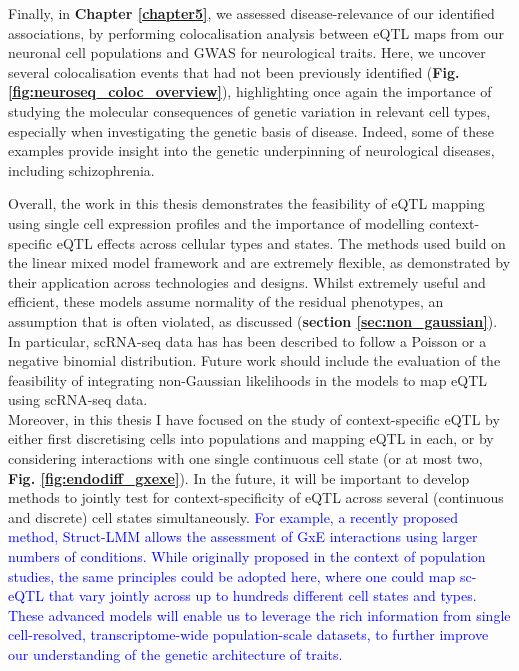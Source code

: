 Finally, in \textbf{Chapter \ref{chapter5}}, we assessed disease-relevance of our identified associations, by performing colocalisation analysis between eQTL maps from our neuronal cell populations and GWAS for neurological traits.
Here, we uncover several colocalisation events that had not been previously identified (\textbf{Fig. \ref{fig:neuroseq_coloc_overview}}), highlighting once again the importance of studying the molecular consequences of genetic variation in relevant cell types, especially when investigating the genetic basis of disease.
Indeed, some of these examples provide insight into the genetic underpinning of neurological diseases, including schizophrenia.

Overall, the work in this thesis demonstrates the feasibility of eQTL mapping using single cell expression profiles and the importance of modelling context-specific eQTL effects across cellular types and states.
The methods used build on the linear mixed model framework and are extremely flexible, as demonstrated by their application across technologies and designs. 
Whilst extremely useful and efficient, these models assume normality of the residual phenotypes, an assumption that is often violated, as discussed (\textbf{section \ref{sec:non_gaussian}}).
In particular, scRNA-seq data has has been described to follow a Poisson or a negative binomial \cite{grun2014validation, hafemeister2019normalization, svensson2020droplet} distribution.
Future work should include the evaluation of the feasibility of integrating non-Gaussian likelihoods in the models to map eQTL using scRNA-seq data. \\

Moreover, in this thesis I have focused on the study of context-specific eQTL by either first discretising cells into populations and mapping eQTL in each, or by considering interactions with one single continuous cell state (or at most two, \textbf{Fig. 
\ref{fig:endodiff_gxexe}}).
In the future, it will be important to develop methods to jointly test for context-specificity of eQTL across several (continuous and discrete) cell states simultaneously.
\textcolor{blue}{For example, a recently proposed method, Struct-LMM \cite{moore2019linear} allows the assessment of GxE interactions using larger numbers of conditions.
While originally proposed in the context of population studies, the same principles could be adopted here, where one could map sc-eQTL that vary jointly across up to hundreds different cell states and types. 
These advanced models will enable us to leverage the rich information from single cell-resolved, transcriptome-wide population-scale datasets, to further improve our understanding of the genetic architecture of traits.} 

